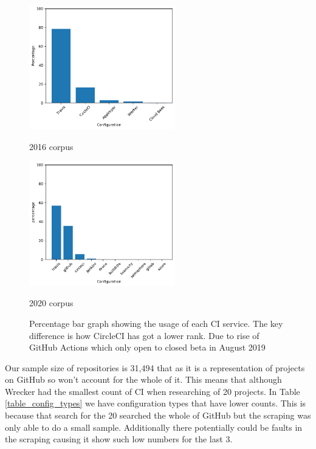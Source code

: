 \documentclass[10pt,conference]{IEEEtran}
\begin{document}


\begin{figure}[!htbp]
  \centering
  \begin{minipage}{.48\textwidth}
    \centering
    \includegraphics[width=2.5in]{../src/results/comparison_config_bar.pdf}
    \caption[]{2016 corpus}
    \label{graph:config_bar2016}
  \end{minipage}
  \begin{minipage}{.48\textwidth}
    \centering
  \includegraphics[width=2.5in]{../src/results/config-topn.pdf}
  \caption[]{2020 corpus}
  \label{graph:config_bar2020}
  \end{minipage}
  \caption[]{Percentage bar graph showing the usage of each CI service. The key difference is how CircleCI has got a lower rank. Due to rise of GitHub Actions which only open to closed beta in August 2019}
  \label{graph:config_bars}

\end{figure}

Our sample size of repositories is 31,494 that as it is a representation of projects on GitHub so won't account for the whole of it. This means that although Wrecker had the smallest count of CI when researching of 20 projects. In Table \ref{table_config_types} we have configuration types that have lower counts. This is because that search for the 20 searched the whole of GitHub but the scraping was only able to do a small sample. Additionally there potentially could be faults in the scraping causing it show such low numbers for the last 3. 
\end{document}
